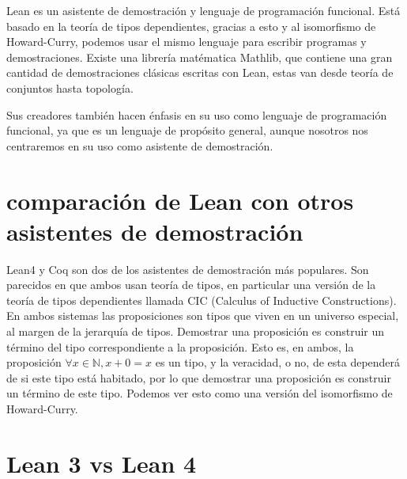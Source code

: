 \documentclass[../main.tex]{subfiles}
\begin{document}
Lean es un asistente de demostración y lenguaje de programación funcional.
Está basado en la teoría de tipos dependientes, gracias a esto y al 
isomorfismo de Howard-Curry, podemos usar el mismo lenguaje para escribir
programas y demostraciones. Existe una librería matématica Mathlib, que
contiene una gran cantidad de demostraciones clásicas escritas con Lean,
estas van desde teoría de conjuntos hasta topología.

Sus creadores también hacen énfasis en su uso como lenguaje de programación
funcional, ya que es un lenguaje de propósito general, aunque nosotros
nos centraremos en su uso como asistente de demostración.

\section{comparación de Lean con otros asistentes de demostración}

Lean4 y Coq son dos de los asistentes de demostración más populares.
Son parecidos en que ambos usan teoría de tipos, en particular una
versión de la teoría de tipos dependientes llamada CIC 
(Calculus of Inductive Constructions). En ambos sistemas las proposiciones
son tipos que viven en un universo especial, al margen de la jerarquía de
tipos. Demostrar una proposición es construir un término del tipo
correspondiente a la proposición. Esto es, en ambos, la proposición
\(\forall x \in \mathbb{N}, x + 0 = x\) es un tipo, y la veracidad,
o no, de esta dependerá de si este tipo está habitado, por lo que demostrar
una proposición es construir un término de este tipo. Podemos ver esto
como una versión del isomorfismo de Howard-Curry.

\section{Lean 3 vs Lean 4}
\end{document}
